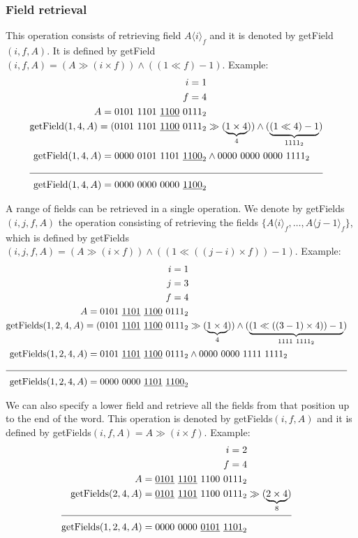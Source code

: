 \subsubsection{Field retrieval}

This operation consists of retrieving field $A\langle i\rangle_f$ and it is denoted by getField$(i, f, A)$. It is defined by getField$(i, f, A) = (A \gg (i \times f)) \wedge ((1 \ll f) - 1)$. Example:
\begin{align*}
    i = 1\\
    f = 4\\
    A = 0101\ 1101\ \underline{1100}\ 0111_2& \\
    \text{getField}(1, 4, A) = (0101\ 1101\ \underline{1100}\ 0111_2& \gg (\underbrace{1 \times 4}_{4})) \wedge (\underbrace{(1 \ll 4) - 1}_{1111_2})\\
    \text{getField}(1, 4, A) = 0000\ 0101\ 1101\ \underline{1100}_2& \wedge 0000\ 0000\ 0000\ 1111_2 \\
    \cline{1-2}
    \text{getField}(1, 4, A) = 0000\ 0000\ 0000\ \underline{1100}_2&
\end{align*}

A range of fields can be retrieved in a single operation. We denote by getFields$(i, j, f, A)$ the operation consisting of retrieving the fields $\{A\langle i\rangle_f,\dots , A\langle j-1\rangle_f\}$, which is defined by getFields$(i, j, f, A) = (A \gg (i \times f)) \wedge ((1 \ll ((j - i) \times f)) - 1)$. Example:
\begin{align*}
    i = 1\\
    j = 3\\
    f = 4\\
    A = 0101\ \underline{1101}\ \underline{1100}\ 0111_2& \\
    \text{getFields}(1, 2, 4, A) = (0101\ \underline{1101}\ \underline{1100}\ 0111_2& \gg (\underbrace{1 \times 4}_{4})) \wedge (\underbrace{(1 \ll ((3 - 1) \times 4)) - 1}_{1111\ 1111_2})\\
    \text{getFields}(1, 2, 4, A) = 0101\ \underline{1101}\ \underline{1100}\ 0111_2& \wedge 0000\ 0000\ 1111\ 1111_2 \\
    \cline{1-2}
    \text{getFields}(1, 2, 4, A) = 0000\ 0000\ \underline{1101}\ \underline{1100}_2&
\end{align*}

We can also specify a lower field and retrieve all the fields from that position up to the end of the word. This operation is denoted by getFields$(i, f, A)$ and it is defined by getFields$(i, f, A) = A \gg (i \times f)$. Example:
\begin{align*}
    i = 2\\
    f = 4\\
    A = \underline{0101}\ \underline{1101}\ 1100\ 0111_2& \\
    \text{getFields}(2, 4, A) = \underline{0101}\ \underline{1101}\ 1100\ 0111_2& \gg (\underbrace{2 \times 4}_{8})\\
    \cline{1-2}
    \text{getFields}(1, 2, 4, A) = 0000\ 0000\ \underline{0101}\ \underline{1101}_2&
\end{align*}

